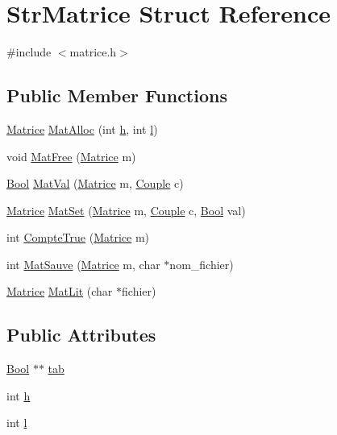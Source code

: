\hypertarget{structStrMatrice}{
\section{StrMatrice Struct Reference}
\label{structStrMatrice}
}


{\ttfamily \#include $<$matrice.h$>$}

\subsection*{Public Member Functions}
\begin{DoxyCompactItemize}
\item 
\hyperlink{structStrMatrice}{Matrice} \hyperlink{structStrMatrice_a413b83de8fe4333288b15d13e471e251}{MatAlloc} (int \hyperlink{structStrMatrice_a2ff616d8e04d6f7b9ea46d70a239fbcc}{h}, int \hyperlink{structStrMatrice_a3f73a35bfec6fce9ec97d4862371c1b2}{l})
\item 
void \hyperlink{structStrMatrice_a0e27d4a36ad549186269ce6f56195b3d}{MatFree} (\hyperlink{structStrMatrice}{Matrice} m)
\item 
\hyperlink{matrice_8h_a253b248072cfc8bd812c69acd0046eed}{Bool} \hyperlink{structStrMatrice_a04014756edd74cc52800a506863981a8}{MatVal} (\hyperlink{structStrMatrice}{Matrice} m, \hyperlink{structCouple}{Couple} c)
\item 
\hyperlink{structStrMatrice}{Matrice} \hyperlink{structStrMatrice_ab24452b9008d3b07f3c77e6e0f3be54d}{MatSet} (\hyperlink{structStrMatrice}{Matrice} m, \hyperlink{structCouple}{Couple} c, \hyperlink{matrice_8h_a253b248072cfc8bd812c69acd0046eed}{Bool} val)
\item 
int \hyperlink{structStrMatrice_a873bc95fcfa940a36b775a60b53c5475}{CompteTrue} (\hyperlink{structStrMatrice}{Matrice} m)
\item 
int \hyperlink{structStrMatrice_a72f035ab94d8786c570242d7e51a2125}{MatSauve} (\hyperlink{structStrMatrice}{Matrice} m, char $\ast$nom\_\-fichier)
\item 
\hyperlink{structStrMatrice}{Matrice} \hyperlink{structStrMatrice_aef99ab1c4c331b4c3b421276ad967be0}{MatLit} (char $\ast$fichier)
\end{DoxyCompactItemize}
\subsection*{Public Attributes}
\begin{DoxyCompactItemize}
\item 
\hyperlink{matrice_8h_a253b248072cfc8bd812c69acd0046eed}{Bool} $\ast$$\ast$ \hyperlink{structStrMatrice_a9500c8a6adfdbed1824d36b547a5eb56}{tab}
\item 
int \hyperlink{structStrMatrice_a2ff616d8e04d6f7b9ea46d70a239fbcc}{h}
\item 
int \hyperlink{structStrMatrice_a3f73a35bfec6fce9ec97d4862371c1b2}{l}
\end{DoxyCompactItemize}


